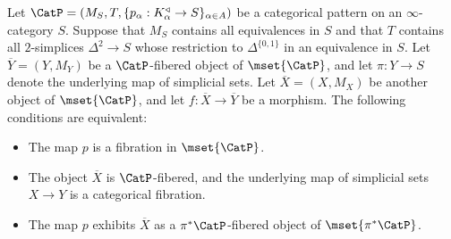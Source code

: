 \begin{proposition}\label{fibraman}
Let $\CatP = (M_S, T, \{ p_{\alpha}: K_{\alpha}^{\triangleleft} \rightarrow S \}_{\alpha \in A})$
be a categorical pattern on an $\infty$-category $S$. Suppose that $M_{S}$ contains all equivalences in $S$ and that $T$ contains
all $2$-simplices $\Delta^2 \rightarrow S$ whose restriction to $\Delta^{ \{0,1\} }$ in an equivalence in $S$. Let $\overline{Y} = (Y,M_Y)$ be a $\CatP$-fibered object of $\mset{\CatP}$, and
let $\pi: Y \rightarrow S$ denote the underlying map of simplicial sets. Let
$\overline{X} = (X, M_X)$ be another object of $\mset{\CatP}$, and let
$f: \overline{X} \rightarrow \overline{Y}$ be a morphism. The following conditions are equivalent:
\begin{itemize}
\item[$(a)$] The map $p$ is a fibration in $\mset{\CatP}$.

\item[$(b)$] The object $\overline{X}$ is $\CatP$-fibered, and the underlying map of simplicial sets
$X \rightarrow Y$ is a categorical fibration.

\item[$(c)$] The map $p$ exhibits $\overline{X}$ as a $\pi^{\ast} \CatP$-fibered object of
$\mset{ \pi^{\ast} \CatP}$. 
\end{itemize}
\end{proposition}

